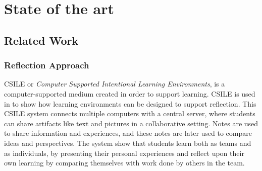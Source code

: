\chapter{State of the art}
\label{chap:stateoftheart}



\section{Related Work}
\label{sec:relatedwork}
\subsection{Reflection Approach}
CSILE or \emph{Computer Supported Intentional Learning Environments}, is a computer-supported medium created in order to support learning. CSILE is used in \citep{scardamalia1989computer} to show how learning environments can be designed to support reflection. This CSILE system connects multiple computers with a central server, where students can share artifacts like text and pictures in a collaborative setting. Notes are used to share information and experiences, and these notes are later used to compare ideas and perspectives. The system show that students learn both as teams and as individuals, by presenting their personal experiences and reflect upon their own learning by comparing themselves with work done by others in the team. 

